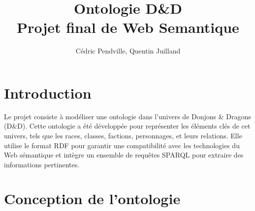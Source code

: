 \documentclass{article}
\title{\textbf{Ontologie D\&D\\Projet final de Web Semantique}}
\author{Cédric Pendville, Quentin Juilland}
\date{}
\begin{document}
\maketitle


\section{Introduction}

Le projet consiste à modéliser une ontologie dans l'univers de Donjons \& Dragons (D\&D). Cette ontologie a été développée pour représenter les éléments clés de cet univers, tels que les races, classes, factions, personnages, et leurs relations. Elle utilise le format RDF pour garantir une compatibilité avec les technologies du Web sémantique et intègre un ensemble de requêtes SPARQL pour extraire des informations pertinentes.

\section{Conception de l'ontologie}
\end{document}
